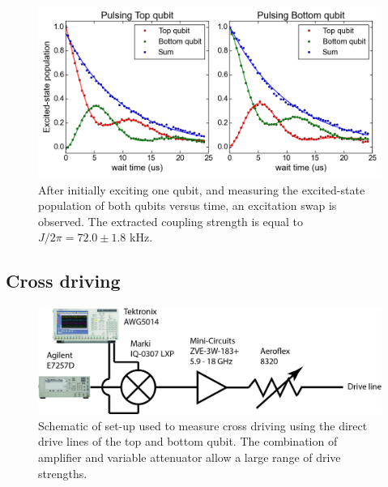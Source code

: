       \begin{figure}[h]
        \centering
        \includegraphics[width=\linewidth]{Figures/Exploring frequency re-use/excitation_swap.png}
        \caption{After initially exciting one qubit, and measuring the excited-state population of both qubits versus time, an excitation swap is observed. The extracted coupling strength is equal to $J/2\pi=72.0 \pm 1.8$ kHz.}
        \label{fig:excitation swap}
      \end{figure}

    \subsection{Cross driving}
      \label{ssec:cross driving}

      \begin{figure}[h]
        \centering
        \includegraphics[width=.8\textwidth]{Figures/Exploring frequency re-use/cross-driving_setup.jpg}
        \caption{Schematic of set-up used to measure cross driving using the direct drive lines of the top and bottom qubit. The combination of amplifier and variable attenuator allow a large range of drive strengths.}
        \label{fig:cross-driving schematic}
      \end{figure}


